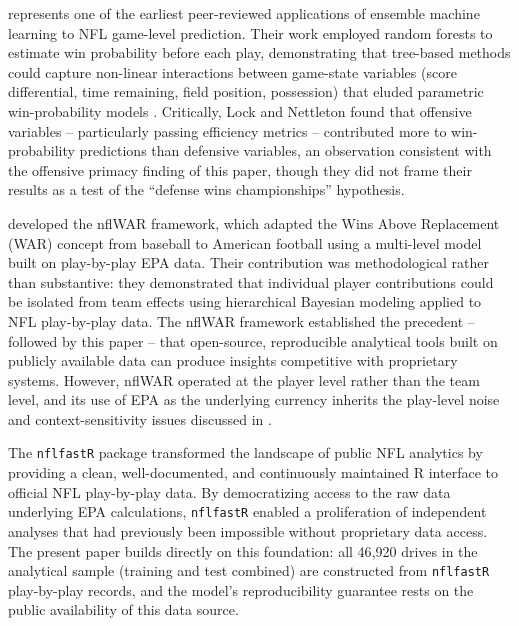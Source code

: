 \textcite{lock2014randomforests} represents one of the earliest peer-reviewed applications of ensemble machine learning to NFL game-level prediction. Their work employed random forests \parencite{breiman2001randomforests} to estimate win probability before each play, demonstrating that tree-based methods could capture non-linear interactions between game-state variables (score differential, time remaining, field position, possession) that eluded parametric win-probability models \parencite{stern1991probability,glickman1998statespacenfl}. Critically, Lock and Nettleton found that offensive variables  -- particularly passing efficiency metrics  -- contributed more to win-probability predictions than defensive variables, an observation consistent with the offensive primacy finding of this paper, though they did not frame their results as a test of the ``defense wins championships'' hypothesis.

\textcite{yurko2019nflwar} developed the nflWAR framework, which adapted the Wins Above Replacement (WAR) concept from baseball to American football using a multi-level model built on play-by-play EPA data. Their contribution was methodological rather than substantive: they demonstrated that individual player contributions could be isolated from team effects using hierarchical Bayesian modeling applied to NFL play-by-play data. The nflWAR framework established the precedent  -- followed by this paper  -- that open-source, reproducible analytical tools built on publicly available data can produce insights competitive with proprietary systems. However, nflWAR operated at the player level rather than the team level, and its use of EPA as the underlying currency inherits the play-level noise and context-sensitivity issues discussed in .

The \texttt{nflfastR} package \parencite{carl2021nflfastr} transformed the landscape of public NFL analytics by providing a clean, well-documented, and continuously maintained R interface to official NFL play-by-play data. By democratizing access to the raw data underlying EPA calculations, \texttt{nflfastR} enabled a proliferation of independent analyses that had previously been impossible without proprietary data access. The present paper builds directly on this foundation: all 46{,}920 drives in the analytical sample (training and test combined) are constructed from \texttt{nflfastR} play-by-play records, and the model's reproducibility guarantee rests on the public availability of this data source.

